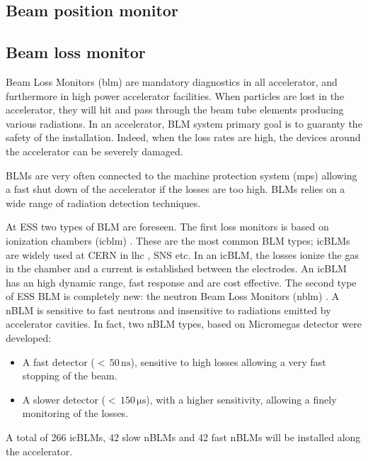 \begin{refsection}
  \subsection{Beam position monitor}

  \subsection{Beam loss monitor}
  Beam Loss Monitors (\acrshort{blm}) are mandatory diagnostics in all accelerator, and furthermore in high power accelerator facilities. When particles are lost in the accelerator, they will hit and pass through the beam tube elements producing various radiations. In an accelerator, BLM system primary goal is to guaranty the safety of the installation. Indeed, when the loss rates are high, the devices around the accelerator can be severely damaged.

  BLMs are very often connected to the machine protection system (\acrshort{mps}) allowing a fast shut down of the accelerator if the losses are too high. BLMs relies on a wide range of radiation detection techniques.

  At ESS two types of BLM are foreseen. The first loss monitors is based on ionization chambers (\acrshort{icblm}) \cite{Grishin:IBIC2017-WEPWC03}. These are the most common BLM types; icBLMs are widely used at CERN in \acrshort{lhc} \cite{HOLZER20122055}, SNS etc. In an icBLM, the losses ionize the gas in the chamber and a current is established between the electrodes. An icBLM has an high dynamic range, fast response and are cost effective.
  The second type of ESS BLM is completely new: the neutron Beam Loss Monitors (\acrshort{nblm}) \cite{Papaevangelou:HB2018-THA1WE04}.
  A nBLM is sensitive to fast neutrons and insensitive to radiations emitted by accelerator cavities. In fact, two nBLM types, based on Micromegas detector \cite{GIOMATARIS199629} were developed:
  \begin{itemize}
    \item A fast detector ($<\,50\,\mathrm{ns}$), sensitive to high losses allowing a very fast stopping of the beam.
    \item A slower detector ($<\,150\,\mathrm{\mu s}$), with a higher sensitivity, allowing a finely monitoring of the losses.
  \end{itemize}

  A total of 266 icBLMs, 42 slow nBLMs and 42 fast nBLMs will be installed along the accelerator.


\end{refsection}
